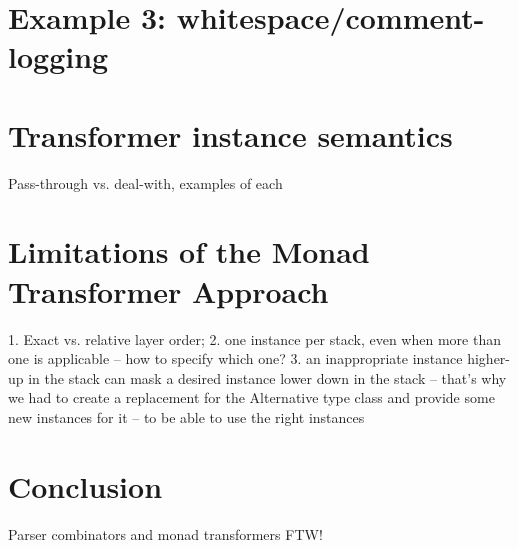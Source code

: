 \documentclass{tmr}
\begin{document}
\section{Example 3: whitespace/comment-logging}




\section{Transformer instance semantics}

Pass-through vs. deal-with, examples of each


\section{Limitations of the Monad Transformer Approach}

1. Exact vs. relative layer order; 
2. one instance per stack, even when more than one is applicable --
how to specify which one?
3. an inappropriate instance higher-up in the stack can mask a 
desired instance lower down in the stack -- that's why we had to
create a replacement for the Alternative type class and provide
some new instances for it -- to be able to use the right instances



\section{Conclusion}

Parser combinators and monad transformers FTW!



\end{document}
